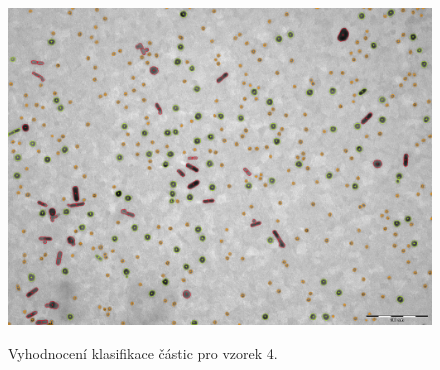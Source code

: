 \documentclass[11pt,twoside,a4paper,table]{book}
\begin{document}
\begin{figure}[hb]
\center
\includegraphics[width=\textwidth]{figures/multi6_klasifikace.png}
\label{fig:class4}
\caption{Vyhodnocení klasifikace částic pro vzorek 4.}
\end{figure}
\end{document}
